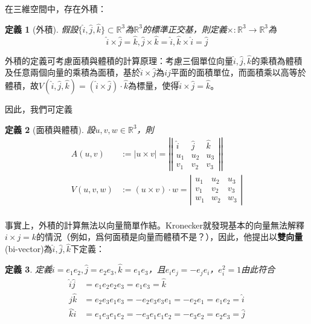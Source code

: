 \documentclass[12pt]{article}
\newtheorem{definition}{定義}
\begin{document}
    在三維空間中，存在外積：

    \begin{definition}[外積]
        假設$\{\hat{i},\hat{j},\hat{k}\}\subset \mathbb{R}^3$為$\mathbb{R}^3$的標準正交基，則定義$\times:\mathbb{R}^3\to\mathbb{R}^3$為$$\hat{i}\times \hat{j}=\hat{k},\hat{j}\times \hat{k}=\hat{i}, \hat{k}\times \hat{i}=\hat{j}$$
    \end{definition}

    外積的定義可考慮面積與體積的計算原理：考慮三個單位向量$\hat{i},\hat{j},\hat{k}$的乘積為體積及任意兩個向量的乘積為面積，基於$\hat{i}\times \hat{j}$為$ij$平面的面積單位，而面積乘以高等於體積，故$V(\hat{i},\hat{j},\hat{k})=(\hat{i}\times \hat{j})\cdot \hat{k}$為標量，使得$\hat{i}\times\hat{j}=\hat{k}$。

    因此，我們可定義

    \begin{definition}[面積與體積]
        設$u,v,w\in\mathbb{R}^3$，則\begin{align*}
            A(u,v)&:=|u\times v|=\left|\left|\begin{matrix}
                \hat{i}&\hat{j}&\hat{k}\\
                u_1&u_2&u_3\\
                v_1&v_2&v_3
            \end{matrix}\right|\right|\\
            V(u,v,w)&:=(u\times v)\cdot w=\left|\begin{matrix}
                u_1&u_2&u_3\\
                v_1&v_2&v_3\\
                w_1&w_2&w_3
            \end{matrix}\right|\\
        \end{align*}
    \end{definition}

    事實上，外積的計算無法以向量簡單作結。Kronecker就發現基本的向量無法解釋$i\times j=k$的情況（例如，爲何面積是向量而體積不是？），因此，他提出以\textbf{雙向量}(bi-vector)為$\hat{i},\hat{j},\hat{k}$下定義：

    \begin{definition}
        定義$\hat{i}=e_1e_2,\hat{j}=e_2e_3,\hat{k}=e_1e_3$，且$e_ie_j=-e_je_i$，$e_i^2=1$由此符合\begin{align*}
            \hat{i}\hat{j}&=e_1e_2e_2e_3=e_1e_3=\hat{k}\\
            \hat{j}\hat{k}&=e_2e_3e_1e_3=-e_2e_3e_3e_1=-e_2e_1=e_1e_2=\hat{i}\\
            \hat{k}\hat{i}&=e_1e_3e_1e_2=-e_3e_1e_1e_2=-e_3e_2=e_2e_3=\hat{j}
        \end{align*}
    \end{definition}
\end{document}

